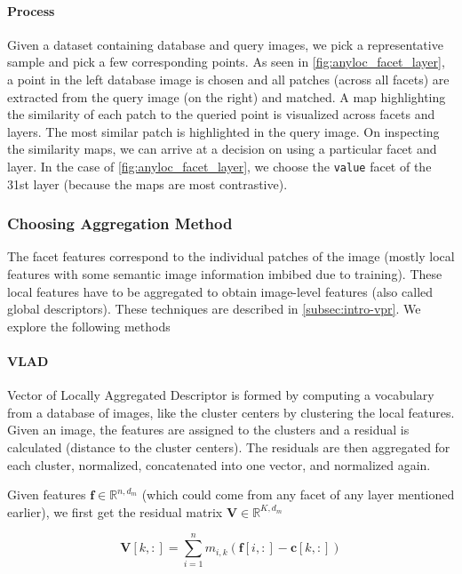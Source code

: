 \paragraph{Process} Given a dataset containing database and query
images, we pick a representative sample and pick a few corresponding
points. As seen in \cref{fig:anyloc_facet_layer}, a point in the left
database image is chosen and all patches (across all facets) are
extracted from the query image (on the right) and matched. A map
highlighting the similarity of each patch to the queried point is
visualized across facets and layers. The most similar patch is 
highlighted in the query image. On inspecting the similarity maps, we
can arrive at a decision on using a particular facet and layer. In the
case of \cref{fig:anyloc_facet_layer}, we choose the \texttt{value}
facet of the 31st layer (because the maps are most contrastive).


\subsubsection{Choosing Aggregation Method}

The facet features correspond to the individual patches of the image
(mostly local features with some semantic image information imbibed
due to training). These local features have to be aggregated to obtain
image-level features (also called global descriptors). These
techniques are described in \cref{subsec:intro-vpr}. We explore the 
following methods

\paragraph{VLAD} Vector of Locally Aggregated Descriptor is formed by
computing a vocabulary from a database of images, like the cluster
centers by clustering the local features. Given an image, the features
are assigned to the clusters and a residual is calculated (distance to
the cluster centers). The residuals are then aggregated for each
cluster, normalized, concatenated into one vector, and normalized
again.

Given features $\mathbf{f} \in \mathbb{R}^{n, d_m}$ (which could come 
from any facet of any layer mentioned earlier), we first get the
residual matrix $\mathbf{V} \in \mathbb{R}^{K, d_m}$

\begin{equation}
    \mathbf{V}[k, :] = \sum_{i=1}^{n} m_{i,k} (\mathbf{f}[i, :] - 
        \mathbf{c}[k, :])
\end{equation}

